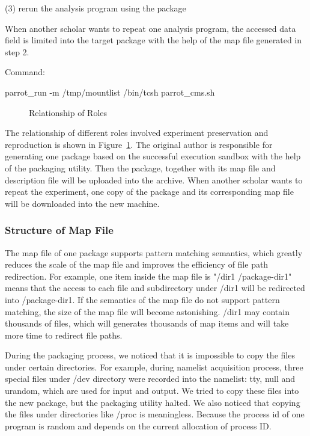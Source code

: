 \documentclass{acm_proc_article-sp}
\begin{document}
(3) rerun the analysis program using the package

When another scholar wants to repeat one analysis program, the accessed data
field is limited into the target package with the help of the map file 
generated in step 2. 

Command:

parrot\_run -m /tmp/mountlist /bin/tcsh parrot\_cms.sh

\begin{figure}
\centering
{}
\caption{Relationship of Roles}
\label{fig:solution3}
\end{figure}

The relationship of different roles involved experiment preservation and
reproduction is shown in Figure~\ref{fig:solution3}.  The original author is
responsible for generating one package based on the successful execution
sandbox with the help of the packaging utility. Then the package, together with
its map file and description file will be uploaded into the archive. When
another scholar wants to repeat the experiment, one copy of the package and its
corresponding map file will be downloaded into the new machine.

\subsubsection{Structure of Map File} 

The map file of one package supports pattern matching semantics,
which greatly reduces the scale of the map file and improves the efficiency of file path redirection. 
For example,
one item inside the map file is "/dir1 /package-dir1" means that the access to each file and
subdirectory under /dir1 will be redirected into /package-dir1.
If the semantics of the map file do not support pattern matching, the size of the map file will become astonishing. 
/dir1 may contain thousands of files, which will generates thousands of map items and will take more time to redirect file paths.

During the packaging process, we noticed
that it is impossible to copy the files under certain directories.
For example, during namelist acquisition process, three special files under /dev directory were recorded into the namelist: tty, null and urandom, which are used for input and output.
We tried to copy these files into the new package, but the packaging utility halted.
We also noticed that copying the files under directories like /proc is
meaningless. Because the process id of one program is random and depends on the
current allocation of process ID. 
\end{document}
